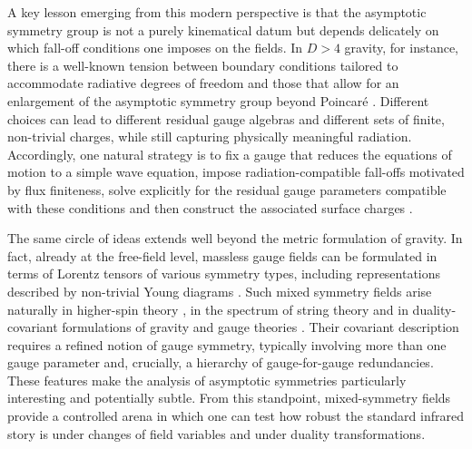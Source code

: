 \documentclass[a4paper,12pt]{article}
\begin{document}
A key lesson emerging from this modern perspective is that the asymptotic symmetry group is not a purely kinematical datum but depends delicately on which fall-off conditions one imposes on the fields. In $D>4$ gravity, for instance, there is a well-known tension between boundary conditions tailored to accommodate radiative degrees of freedom and those that allow for an enlargement of the asymptotic symmetry group beyond Poincar\'e \cite{TanabeTanahashiShiromizu2010NullInfinity5D, TanabeKinoshitaShiromizu2011NullInfinityAnyD, Fuentealba:2022BMS5PRL, Fuentealba:2022HamiltonianBMS5}. Different choices can lead to different residual gauge algebras and different sets of finite, non-trivial charges, while still capturing physically meaningful radiation. Accordingly, one natural strategy is to fix a gauge that reduces the equations of motion to a simple wave equation, impose radiation-compatible fall-offs motivated by flux finiteness, solve explicitly for the residual gauge parameters compatible with these conditions and then construct the associated surface charges \cite{Ruzziconi:2019pzd, Ciambelli:2022vot}.

The same circle of ideas extends well beyond the metric formulation of gravity. In fact, already at the free-field level, massless gauge fields can be formulated in terms of Lorentz tensors \cite{Bekaert:2006py} of various symmetry types, including representations described by non-trivial Young diagrams \cite{Curtright:1980un, Curtright:1980yk, Curtright:1980yj, Curtright:2019yur, CURTRIGHT1985304, Labastida:1986gy, Labastida:1987kw}. Such mixed symmetry fields arise naturally in higher-spin theory \cite{vukovic2018, Vasiliev_2004, witfre, sagnotti2012notes}, in the spectrum of string theory \cite{Polchinski:1998rq, Polchinski:1998rr, green_schwarz_witten_2012, Green:2012pqa} and in duality-covariant formulations of gravity and gauge theories \cite{Hull:2000zn, Hull:2001iu, Medeiros_2003, Manzoni:2025zmi}. Their covariant description requires a refined notion of gauge symmetry, typically involving more than one gauge parameter and, crucially, a hierarchy of gauge-for-gauge redundancies. These features make the analysis of asymptotic symmetries particularly interesting and potentially subtle. From this standpoint, mixed-symmetry fields provide a controlled arena in which one can test how robust the standard infrared story is under changes of field variables and under duality transformations.
\end{document}

